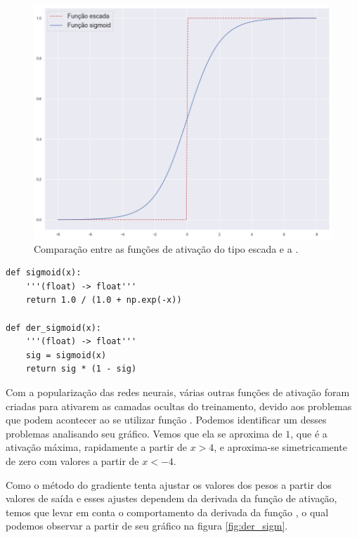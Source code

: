 \newpage

\begin{figure}[htb]
\centering
\includegraphics[width=12cm]{figuras/ativacao}
\caption{Comparação entre as funções de ativação do tipo escada e a .}
\label{fig:ativacao}
\end{figure}

\begin{scriptsize}
\estiloR
\begin{lstlisting}[caption={Trecho do script util.py}, label={lst:ativacao}, escapeinside={\%}]
def sigmoid(x):
    '''(float) -> float'''
    return 1.0 / (1.0 + np.exp(-x))

def der_sigmoid(x):
    '''(float) -> float'''
    sig = sigmoid(x)
    return sig * (1 - sig)
\end{lstlisting}
\end{scriptsize}

Com a popularização das redes neurais, várias outras funções de ativação foram criadas para ativarem as camadas ocultas do treinamento, devido aos problemas que podem acontecer ao se utilizar função . Podemos identificar um desses problemas analisando seu gráfico. Vemos que ela se aproxima de $1$, que é a ativação máxima, rapidamente a partir de $x > 4$, e aproxima-se simetricamente de zero com valores a partir de $x < -4$. 

Como o método do gradiente tenta ajustar os valores dos pesos a partir dos valores de saída e esses ajustes dependem da derivada da função de ativação, temos que levar em conta o comportamento da derivada da função , o qual podemos observar a partir de seu gráfico na figura \ref{fig:der_sigm}.

